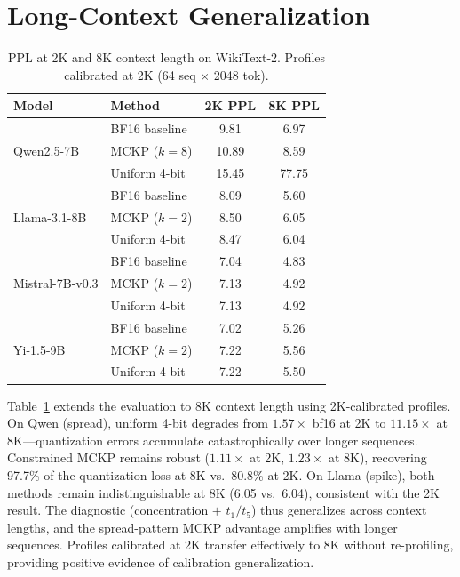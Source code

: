\section{Long-Context Generalization}
\label{sec:long_context}

\begin{table}[ht]
\centering
\small
\caption{PPL at 2K and 8K context length on WikiText-2. Profiles calibrated at 2K (64 seq $\times$ 2048 tok).}
\label{tab:long_context}
\begin{tabular}{llcc}
\toprule
Model & Method & 2K PPL & 8K PPL \\
\midrule
 & BF16 baseline & 9.81 & 6.97 \\
Qwen2.5-7B & MCKP ($k{=}8$) & 10.89 & 8.59 \\
 & Uniform 4-bit & 15.45 & 77.75 \\
\midrule
 & BF16 baseline & 8.09 & 5.60 \\
Llama-3.1-8B & MCKP ($k{=}2$) & 8.50 & 6.05 \\
 & Uniform 4-bit & 8.47 & 6.04 \\
\midrule
 & BF16 baseline & 7.04 & 4.83 \\
Mistral-7B-v0.3 & MCKP ($k{=}2$) & 7.13 & 4.92 \\
 & Uniform 4-bit & 7.13 & 4.92 \\
\midrule
 & BF16 baseline & 7.02 & 5.26 \\
Yi-1.5-9B & MCKP ($k{=}2$) & 7.22 & 5.56 \\
 & Uniform 4-bit & 7.22 & 5.50 \\
\bottomrule
\end{tabular}
\end{table}

Table~\ref{tab:long_context} extends the evaluation to 8K context length using 2K-calibrated profiles.
On Qwen (spread), uniform 4-bit degrades from $1.57\times$ bf16 at 2K to $11.15\times$ at 8K---quantization errors accumulate catastrophically over longer sequences.
Constrained MCKP remains robust ($1.11\times$ at 2K, $1.23\times$ at 8K), recovering 97.7\% of the quantization loss at 8K vs.\ 80.8\% at 2K.
On Llama (spike), both methods remain indistinguishable at 8K (6.05 vs.\ 6.04), consistent with the 2K result.
The diagnostic (concentration $+$ $t_1/t_5$) thus generalizes across context lengths, and the spread-pattern MCKP advantage amplifies with longer sequences.
Profiles calibrated at 2K transfer effectively to 8K without re-profiling, providing positive evidence of calibration generalization.
